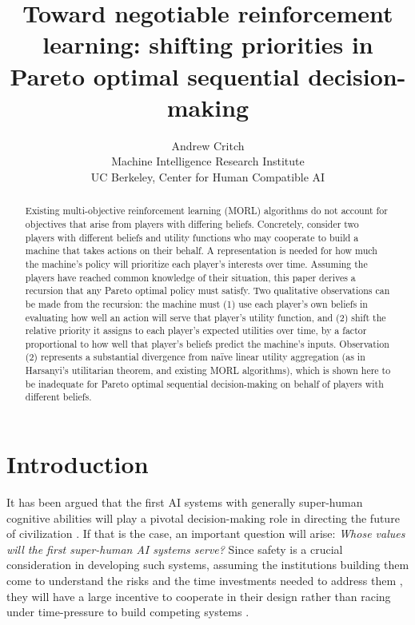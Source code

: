 \documentclass{article}
\title{Toward negotiable reinforcement learning: shifting priorities in Pareto optimal sequential decision-making}
\author{Andrew Critch\\ Machine Intelligence Research Institute \\ UC Berkeley, Center for Human Compatible AI}
\begin{document}
\maketitle


\begin{abstract}
Existing multi-objective reinforcement learning (MORL) algorithms do not account for objectives that arise from players with differing beliefs.  Concretely, consider two players with different beliefs and utility functions who may cooperate to build a machine that takes actions on their behalf.  A representation is needed for how much the machine's policy will prioritize each player's interests over time.  Assuming the players have reached common knowledge of their situation, this paper derives a recursion that any Pareto optimal policy must satisfy.  Two qualitative observations can be made from the recursion: the machine must (1) use each player's own beliefs in evaluating how well an action will serve that player's utility function, and (2) shift the relative priority it assigns to each player's expected utilities over time, by a factor proportional to how well that player's beliefs predict the machine's inputs.  Observation (2) represents a substantial divergence from na\"{i}ve linear utility aggregation (as in Harsanyi's utilitarian theorem, and existing MORL algorithms), which is shown here to be inadequate for Pareto optimal sequential decision-making on behalf of players with different beliefs.
\end{abstract}



\section{Introduction}

It has been argued that the first AI systems with generally super-human cognitive abilities will play a pivotal decision-making role in directing the future of civilization \citep{bostrom2014superintelligence}.  If that is the case, an important question will arise: \emph{Whose values will the first super-human AI systems serve?}  Since safety is a crucial consideration in developing such systems, assuming the institutions building them come to understand the risks and the time investments needed to address them \citep{baum2016promotion}, they will have a large incentive to cooperate in their design rather than racing under time-pressure to build competing systems \citep{armstrong2016racing}.
\end{document}
